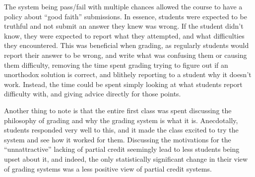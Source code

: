 \documentclass{article}
\begin{document}
The system being pass/fail with multiple chances allowed the course to have a policy about ``good faith'' submissions. In essence, students were expected to be truthful and not submit an answer they knew was wrong. If the student didn't know, they were expected to report what they attempted, and what difficulties they encountered. This was beneficial when grading, as regularly students would report their answer to be wrong, and write what was confusing them or causing them difficulty, removing the time spent grading trying to figure out if an unorthodox solution is correct, and blithely reporting to a student why it doesn't work. Instead, the time could be spent simply looking at what students report difficulty with, and giving advice directly for those points.

Another thing to note is that the entire first class was spent discussing the philosophy of grading and why the grading system is what it is. Anecdotally, students responded very well to this, and it made the class excited to try the system and see how it worked for them. Discussing the motivations for the ``unnattractive'' lacking of partial credit seemingly lead to less students being upset about it, and indeed, the only statistically significant change in their view of grading systems was a less positive view of partial credit systems.

\medskip

\printbibliography
\end{document}
